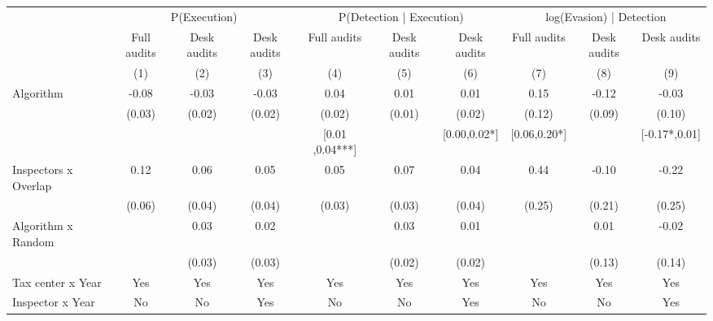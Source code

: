 \begin{tabular}{lccc|ccc|ccc} \toprule
\multicolumn{1}{l}{} & \multicolumn{3}{c}{P(Execution)} & \multicolumn{3}{c}{P(Detection | Execution)} & \multicolumn{3}{c}{log(Evasion) | Detection} \\\cmidrule(lr){2-4}\cmidrule(lr){5-7}\cmidrule(lr){8-10} \multicolumn{1}{l}{} & Full audits & Desk audits & Desk audits & Full audits & Desk audits & Desk audits & Full audits & Desk audits & Desk audits \\ \multicolumn{1}{l}{} & (1) & (2) & (3) & (4) & (5) & (6) & (7) & (8) & (9) \\ \midrule
Algorithm   &       -0.08\sym{***}&       -0.03\sym{*}  &       -0.03\sym{*}  &        0.04\sym{**} &        0.01         &        0.01         &        0.15         &       -0.12         &       -0.03         \\
            &      (0.03)         &      (0.02)         &      (0.02)         &      (0.02)         &      (0.01)         &      (0.02)         &      (0.12)         &      (0.09)         &      (0.10)         \\
\addlinespace
 & & & & [0.01 ,0.04***] & & [0.00,0.02*] & [0.06,0.20*] & & [-0.17*,0.01] \\  Inspectors x Overlap&        0.12\sym{*}  &        0.06\sym{*}  &        0.05         &        0.05\sym{*}  &        0.07\sym{**} &        0.04         &        0.44\sym{*}  &       -0.10         &       -0.22         \\
            &      (0.06)         &      (0.04)         &      (0.04)         &      (0.03)         &      (0.03)         &      (0.04)         &      (0.25)         &      (0.21)         &      (0.25)         \\
\addlinespace
Algorithm x Random&                     &        0.03         &        0.02         &                     &        0.03         &        0.01         &                     &        0.01         &       -0.02         \\
            &                     &      (0.03)         &      (0.03)         &                     &      (0.02)         &      (0.02)         &                     &      (0.13)         &      (0.14)         \\
\midrule
Tax center x Year&         Yes         &         Yes         &         Yes         &         Yes         &         Yes         &         Yes         &         Yes         &         Yes         &         Yes         \\
Inspector x Year&          No         &          No         &         Yes         &          No         &          No         &         Yes         &          No         &          No         &         Yes         \\

\end{tabular}
